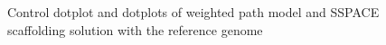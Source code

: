 \documentclass[12pt, twocolumn]{article}
\begin{document}
\begin{figure}[h!]
\begin{center}
{
}
\end{center}
\caption{Control dotplot and dotplots of weighted path model and SSPACE scaffolding solution with the reference genome}
\label{dotplotsols}
\end{figure}
\end{document}
